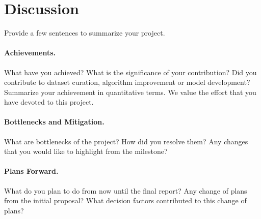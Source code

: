 \documentclass{article}
\begin{document}

\section{Discussion}
\label{sec:discussion}
Provide a few sentences to summarize your project.

\paragraph{Achievements.}
What have you achieved? What is the significance of your contribution? Did you contribute to dataset curation, algorithm improvement or model development?  Summarize your achievement in quantitative terms. We value the effort that you have devoted to this project.




\paragraph{Bottlenecks and Mitigation.}
What are bottlenecks of the project? How did you resolve them?  Any changes that you would like to highlight from the milestone?



\paragraph{Plans Forward.}
What do you plan to do from now until the final report? Any change of plans from the initial proposal? What decision factors contributed to this change of plans?
\end{document}
